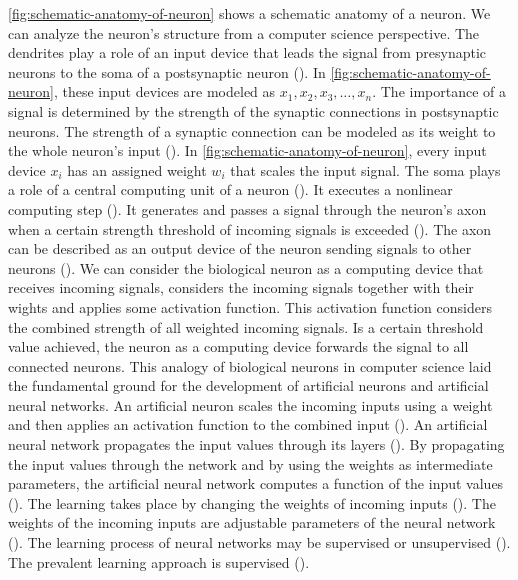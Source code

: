 \documentclass{BachelorBUI}
\begin{document}
            \autoref{fig:schematic-anatomy-of-neuron} shows a schematic anatomy of a neuron. We can analyze the neuron's structure from a computer science perspective. The dendrites play a role of an input device that leads the signal from presynaptic neurons to the soma of a postsynaptic neuron (\cite{Gerstner:2014}). In \autoref{fig:schematic-anatomy-of-neuron}, these input devices are modeled as $x_1, x_2, x_3, \dots, x_n$. The importance of a signal is determined by the strength of the synaptic connections in postsynaptic neurons. The strength of a synaptic connection can be modeled as its weight to the whole neuron's input (\cite{Gerstner:2014}). In \autoref{fig:schematic-anatomy-of-neuron}, every input device $x_i$ has an assigned weight $w_i$ that scales the input signal. The soma plays a role of a central computing unit of a neuron (\cite{Gerstner:2014}). It executes a nonlinear computing step (\cite{Gerstner:2014}). It generates and passes a signal through the neuron's axon when a certain strength threshold of incoming signals is exceeded (\cite{Gerstner:2014}). The axon can be described as an output device of the neuron sending signals to other neurons (\cite{Gerstner:2014}). We can consider the biological neuron as a computing device that receives incoming signals, considers the incoming signals together with their wights and applies some activation function. This activation function considers the combined strength of all weighted incoming signals. Is a certain threshold value achieved, the neuron as a computing device forwards the signal to all connected neurons. This analogy of biological neurons in computer science laid the fundamental ground for the development of artificial neurons and artificial neural networks. An artificial neuron scales the incoming inputs using a weight and then applies an activation function to the combined input (\cite{Aggarwal:2018}). An artificial neural network propagates the input values through its layers (\cite{Aggarwal:2018}). By propagating the input values through the network and by using the weights as intermediate parameters, the artificial neural network computes a function of the input values (\cite{Aggarwal:2018}). The learning takes place by changing the weights of incoming inputs (\cite{Aggarwal:2018}). The weights of the incoming inputs are adjustable parameters of the neural network (\cite{LeCun:2015}). The learning process of neural networks may be supervised or unsupervised (\cite{Aggarwal:2018,LeCun:2015}). The prevalent learning approach is supervised (\cite{LeCun:2015}).
\end{document}
